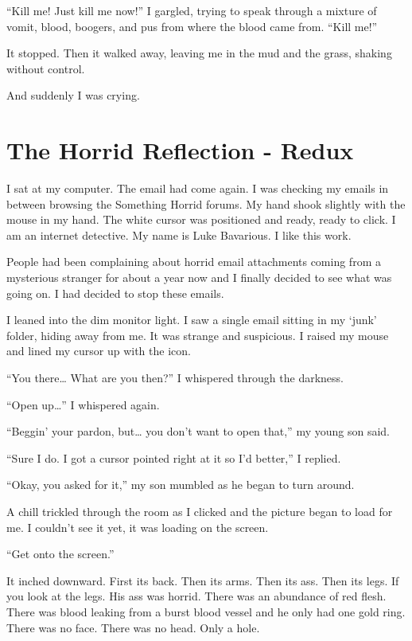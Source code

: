 ``Kill me! Just kill me now!'' I gargled, trying to speak
through a mixture of vomit, blood, boogers, and pus from where the
blood came from. ``Kill me!''



It stopped. Then it walked away, leaving me in the mud and the
grass, shaking without control.



And suddenly I was crying. 
 



\chapter{The Horrid Reflection - Redux}





I sat at my computer. The email had come again. I was checking my
emails in between browsing the Something Horrid forums. My hand
shook slightly with the mouse in my hand. The white cursor was
positioned and ready, ready to click. I am an internet detective.
My name is Luke Bavarious. I like this work.

People had been complaining about horrid email attachments coming
from a mysterious stranger for about a year now and I finally
decided to see what was going on. I had decided to stop these
emails.

I leaned into the dim monitor light. I saw a single email sitting
in my `junk' folder, hiding away from me. It was
strange and suspicious. I raised my mouse and lined my cursor up
with the icon.

``You there{\ldots} What are you then?'' I whispered through the
darkness.

``Open up{\ldots}'' I whispered again.

``Beggin' your pardon, but{\ldots} you don't want to open that,'' my young
son said.

``Sure I do. I got a cursor pointed right at it so I'd
better,'' I replied.

``Okay, you asked for it,'' my son mumbled as he began to turn
around.

A chill trickled through the room as I clicked and the picture
began to load for me. I couldn't see it yet, it was loading on the
screen.

``Get onto the screen.''

It inched downward. First its back. Then its arms. Then its ass.
Then its legs. If you look at the legs. His ass was horrid. There
was an abundance of red flesh. There was blood leaking from a burst
blood vessel and he only had one gold ring. There was no face.
There was no head. Only a hole.

